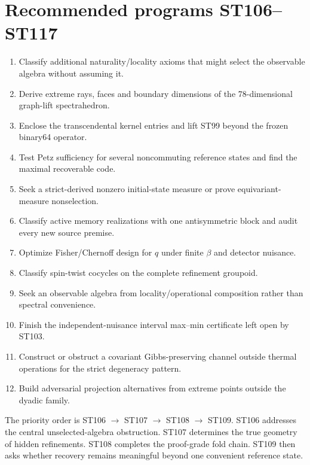 \documentclass[11pt,a4paper]{article}
\begin{document}
\section{Recommended programs ST106--ST117}

\begin{enumerate}
\item[\textbf{ST106}] Classify additional naturality/locality axioms that might select the observable algebra without assuming it.
\item[\textbf{ST107}] Derive extreme rays, faces and boundary dimensions of the 78-dimensional graph-lift spectrahedron.
\item[\textbf{ST108}] Enclose the transcendental kernel entries and lift ST99 beyond the frozen binary64 operator.
\item[\textbf{ST109}] Test Petz sufficiency for several noncommuting reference states and find the maximal recoverable code.
\item[\textbf{ST110}] Seek a strict-derived nonzero initial-state measure or prove equivariant-measure nonselection.
\item[\textbf{ST111}] Classify active memory realizations with one antisymmetric block and audit every new source premise.
\item[\textbf{ST112}] Optimize Fisher/Chernoff design for $q$ under finite $\beta$ and detector nuisance.
\item[\textbf{ST113}] Classify spin-twist cocycles on the complete refinement groupoid.
\item[\textbf{ST114}] Seek an observable algebra from locality/operational composition rather than spectral convenience.
\item[\textbf{ST115}] Finish the independent-nuisance interval max--min certificate left open by ST103.
\item[\textbf{ST116}] Construct or obstruct a covariant Gibbs-preserving channel outside thermal operations for the strict degeneracy pattern.
\item[\textbf{ST117}] Build adversarial projection alternatives from extreme points outside the dyadic family.
\end{enumerate}

The priority order is ST106 $\to$ ST107 $\to$ ST108 $\to$ ST109. ST106 addresses the central unselected-algebra obstruction. ST107 determines the true geometry of hidden refinements. ST108 completes the proof-grade fold chain. ST109 then asks whether recovery remains meaningful beyond one convenient reference state.
\end{document}
